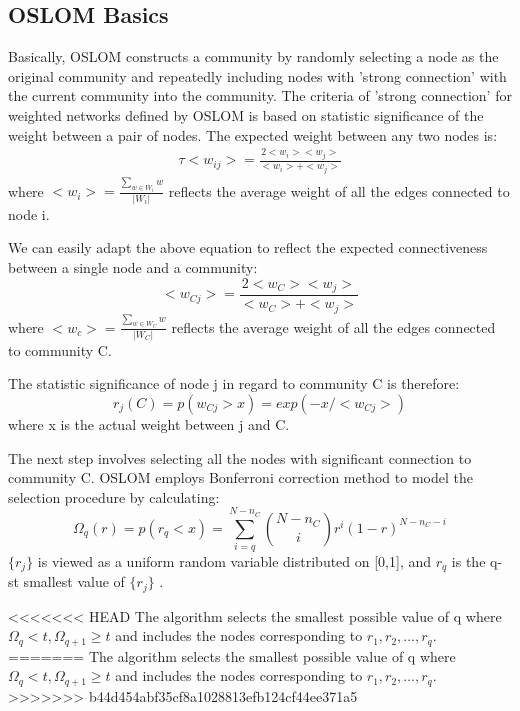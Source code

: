 \documentclass{acmtog} %
\begin{document}
\subsection*{OSLOM Basics}
Basically, OSLOM constructs a community by randomly selecting a node as the original community and repeatedly including nodes with 'strong connection' with the current community into the community.
The criteria of 'strong connection' for weighted networks defined by OSLOM is based on statistic significance of the weight between a pair of nodes. The expected weight between any two nodes is:
\begin{eqnarray}
  \tau	<w_{ij}>=\frac{2<w_{i}><w_{j}>}{<w_{i}>+<w_{j}>}
  \label{eq:Link_n_Stark}
\end{eqnarray}
where $<w_{i}>=\frac{\sum_{w\in W_{i}}w}{|W_{i}|}$ reflects the average weight of all the edges connected to node i.

We can easily adapt the above equation to reflect the expected connectiveness between a single node and a community:
\begin{equation}
\label{eq:moon}
 <w_{Cj}>=\frac{2<w_{C}><w_{j}>}{<w_{C}>+<w_{j}>}
\end{equation}
where $<w_{c}>=\frac{\sum_{w\in W_{C}}w}{|W_{C}|}$ reflects the average weight of all the edges connected to community C.

The statistic significance of node j in regard to community C is therefore:
\begin{equation}
 r_{j}(C )=p(w_{Cj}>x)=exp(-x/<w_{Cj}>)
\end{equation}
where x is the actual weight between j and C.

The next step involves selecting all the nodes with significant connection to community C. OSLOM employs Bonferroni correction method to model the selection procedure by calculating:
\begin{equation}
	\Omega_{q}(r)=p(r_{q}<x)=\sum_{i=q}^{N-n_{C}}\binom{N-n_{C}}{i}r^i(1-r)^{N-n_{C}-i}
\end{equation}
$\{r_{j}\}$ is viewed as a uniform random variable distributed on [0,1], and $r_{q}$ is the q-st smallest value of $\{r_{j}\}$ .

<<<<<<< HEAD
The algorithm selects the smallest possible value of q where $\Omega_{q}<t, \Omega_{q+1}\geq t$ and includes the nodes corresponding to $r_{1}, r_{2},..., r_{q}$.
=======
The algorithm selects the smallest possible value of q where $\Omega_{q}<t, \Omega_{q+1}\geq t$ and includes the nodes corresponding to $r_{1}, r_{2}, …, r_{q}$.
>>>>>>> b44d454abf35cf8a1028813efb124cf44ee371a5
\end{document}
